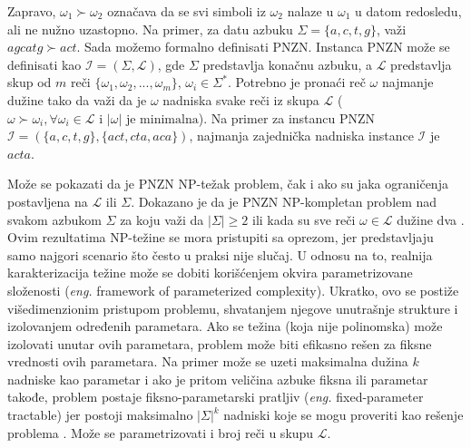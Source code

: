 \documentclass[12pt,oneside]{memoir}
\begin{document}
Zapravo, $\omega_{1}\succ\omega_{2}$ označava da se svi simboli iz $\omega_{2}$ nalaze u $\omega_{1}$ u datom redosledu,
ali ne nužno uzastopno. Na primer, za datu azbuku $\Sigma=\{a,c,t,g\}$, važi $agcatg \succ act$.
Sada možemo formalno definisati PNZN. Instanca PNZN može se definisati kao $\mathcal{I} =(\Sigma,\mathcal{L})$, gde 
$\Sigma$  predstavlja konačnu azbuku, a $\mathcal{L}$ predstavlja skup od $m$ reči $\{\omega_{1},\omega_{2},...,\omega_{m}\}$,
$\omega_{i}\in\Sigma^*$. Potrebno je pronaći reč $\omega$ najmanje dužine tako da važi da je $\omega$ nadniska svake reči iz
skupa $\mathcal{L}$ ($\omega\succ\omega_{i}, \forall\omega_{i}\in\mathcal{L} \textrm{ i } |\omega| \textrm{ je minimalna}$).
Na primer za instancu PNZN $\mathcal{I}=(\{a,c,t,g\},\{act,cta,aca\})$, najmanja zajednička nadniska
instance $\mathcal{I}$ je $acta$.

Može se pokazati da je PNZN NP-težak problem, čak i ako su jaka ograničenja postavljena na $\mathcal{L}$ ili $\Sigma$. 
Dokazano je da je PNZN NP-kompletan problem nad svakom azbukom $\Sigma$ za koju važi da $|\Sigma|\geqslant2$ \cite{NPComplete}
ili kada su sve reči $\omega \in \mathcal{L}$ dužine dva \cite{SCSNP}. Ovim rezultatima NP-težine se mora
pristupiti sa oprezom, jer predstavljaju samo najgori scenario što često u praksi nije slučaj. U odnosu na to,
realnija karakterizacija težine može se dobiti korišćenjem okvira parametrizovane složenosti (\textit{eng.} framework of parameterized
complexity). Ukratko, ovo se postiže višedimenzionim pristupom problemu, shvatanjem njegove unutrašnje strukture i izolovanjem
određenih parametara. Ako se težina (koja nije polinomska) može izolovati unutar ovih parametara, problem može biti
efikasno rešen za fiksne vrednosti ovih parametara. Na primer može se uzeti
maksimalna dužina $k$ nadniske kao parametar i ako je pritom veličina azbuke fiksna ili parametar takođe, problem postaje
fiksno-parametarski pratljiv (\textit{eng.} fixed-parameter tractable) jer postoji maksimalno $|\Sigma|^{k}$ nadniski
koje se mogu proveriti kao rešenje problema \cite{ProbabilisticBS}. Može se parametrizovati i broj reči u skupu $\mathcal{L}$.
\end{document}
